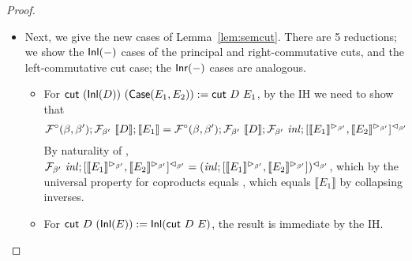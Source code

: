 \documentclass{drl-common/llncs}
\renewcommand{\sem}[1]{\ensuremath{ \llbracket #1 \rrbracket}}
\newcommand\cutsym{\ensuremath{\dsd{cut}}}
\newcommand\cut[2]{\ensuremath{{\cutsym \,\, #1 \,\, #2}}}
\newcommand\Inl[1]{\ensuremath{\dsd{Inl}(#1)}}
\newcommand\Inr[1]{\ensuremath{\dsd{Inr}(#1)}}
\newcommand\Case[2]{\ensuremath{\dsd{Case}(#1,#2)}}
\begin{document}
\begin{proof}
\begin{itemize}
\item Next, we give the new cases of Lemma~\ref{lem:semcut}.  There are
  5 reductions; we show the \Inl{-} cases of the principal and
  right-commutative cuts, and the left-commutative cut case; the \Inr{-}
  cases are analogous.

\begin{itemize}
\item For $\cut{(\Inl{D})}{(\Case{E_1}{E_2})} := \cut{D}{E_1}$,
by the IH we need to show that 
\[
\semofcut{D}{E_1} = \semFcomp(\beta,\beta');\semF{\beta'}{\sem{D}};\semF{\beta'}{\seminl};{\semrtol{\semcase{\semltor{\sem{E_1}}{\beta'}}{\semltor{\sem{E_2}}{\beta'}}}{\beta'}}
\]
By naturality of , 
$\semF{\beta'}{\seminl};{\semrtol{\semcase{\semltor{\sem{E_1}}{\beta'}}{\semltor{\sem{E_2}}{\beta'}}}{\beta'}}
=
\semrtol{(\seminl;{\semcase{\semltor{\sem{E_1}}{\beta'}}{\semltor{\sem{E_2}}{\beta'}}})}{\beta'}$,
which by the universal property for coproducts equals 
\semrtol{({{\semltor{\sem{E_1}}{\beta'}}})}{\beta'},
which equals {\sem{E_1}} by collapsing inverses.  

\item For $\cut{D}{(\Inl{E})} := \Inl{\cut{D}{E}}$,
the result is immediate by the IH.


\end{itemize}
\end{itemize}
\end{proof}
\end{document}
